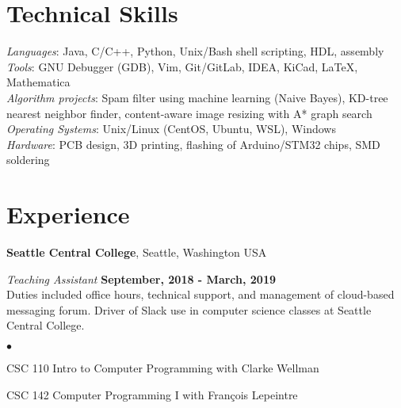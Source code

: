 \documentclass[margin,line]{res}
\newenvironment{list2}{
  \begin{list}{$\bullet$}{%
      \setlength{\itemsep}{0in}
      \setlength{\parsep}{0in} \setlength{\parskip}{0in}
      \setlength{\topsep}{0in} \setlength{\partopsep}{0in} 
      \setlength{\leftmargin}{0.2in}}}{\end{list}}
\begin{document}
\begin{resume}
\vspace{-.2cm}
\section{\sc Technical Skills} 
	{\em Languages}:  
	Java, C/C++, Python, Unix/Bash shell scripting, HDL, assembly
	\\
	{\em Tools}:  
	GNU Debugger (GDB), Vim, Git/GitLab, IDEA, KiCad, \LaTeX, Mathematica 
	\\
	{\em Algorithm projects}: 
	Spam filter using machine learning (Naive Bayes), KD-tree
	nearest neighbor finder, content-aware image resizing with A* graph search
	\\
	{\em Operating Systems}:  
	Unix/Linux (CentOS, Ubuntu, WSL), Windows
	\\
	{\em Hardware}:  PCB design, 3D printing, flashing of Arduino/STM32 chips, SMD soldering
	\\


\vspace{-.3cm}
\section{\sc Experience}


{\bf Seattle Central College}, Seattle, Washington USA

\vspace{-.3cm}
{\em Teaching Assistant} \hfill {\bf September, 2018  - March, 2019}\\
Duties included office hours, technical support, and management of cloud-based messaging forum. 
  Driver of Slack use in computer science classes at Seattle Central College.
\begin{list2}
\item CSC 110 Intro to Computer Programming with Clarke Wellman
\item CSC 142 Computer Programming I with François Lepeintre
\end{list2}     


\end{resume}
\end{document}
